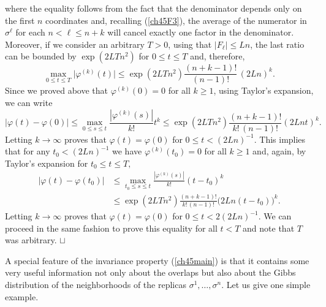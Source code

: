 \documentclass[12pt]{article}
\newcommand\qed{\hfill\hbox{\rlap{$\sqcap$}$\sqcup$}}
\theoremstyle{nonumberplain}
\begin{document}
where the equality follows from the fact that the denominator depends only on the first $n$ coordinates and, recalling (\ref{ch45F3}), the average of the numerator in $\sigma^{\ell}$ for each $n<\ell\leq n+k$ will cancel exactly one factor in the denominator. Moreover, if we consider an arbitrary $T>0$, using that $|F_{\ell}| \leq L n$, the last ratio can be bounded by $\exp (2L T n^2)$ for $0\leq t\leq T$ and, therefore,
$$
\max_{0\leq t\leq T}\bigl|\varphi^{(k)}(t) \bigr| \leq \exp( 2L T n^2) \frac{(n+k-1)!}{(n-1)!}\,  (2Ln)^k.
$$
Since we proved above that $\varphi^{(k)}(0) = 0$ for all $k\geq 1$, using Taylor's expansion, we can write
$$
\bigl|\varphi(t)-\varphi(0) \bigr| 
\leq 
 \max_{0\leq s\leq t} \frac{|\varphi^{(k)}(s)|}{k!}t^k
\leq
\exp(2L T n^2)  \frac{(n+k-1)! }{k! \,(n-1)!} (2Ln t)^k.
$$
Letting $k\to \infty$ proves that $\varphi(t)=\varphi(0)$ for $0\leq t<(2Ln)^{-1}.$ This implies that for any $t_0<(2Ln)^{-1}$ we have $\varphi^{(k)}(t_0)=0$ for all $k\geq 1$ and, again, by Taylor's expansion for $t_0\leq t \leq T,$
\begin{align*}
\bigl|\varphi(t)-\varphi(t_0)\bigr| 
&\leq 
\max_{t_0\leq s\leq t} \frac{|\varphi^{(k)}(s)|}{k!}(t-t_0)^k
\\
&\leq 
\exp(2L T n^2)  \frac{(n+k-1)! }{k! \,(n-1)!} \bigl(2Ln (t-t_0)\bigr)^k.
\end{align*}
Letting $k\to\infty$ proves that $\varphi(t) = \varphi(0)$ for $0\leq t< 2(2Ln)^{-1}.$ We can proceed in the same fashion to prove this equality for all $t< T$ and note that $T$ was arbitrary.
\qed

\medskip
A special feature of the invariance property (\ref{ch45main}) is that it contains some very useful information not only about the overlaps but also about the Gibbs distribution of the neighborhoods of the replicas $\sigma^1,\ldots,\sigma^n.$ Let us give one simple example. 
\end{document}
